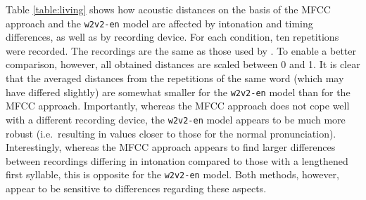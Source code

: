 \documentclass[11pt,a4paper]{article}
\begin{document}
Table \ref{table:living} shows how acoustic distances on the basis of the MFCC approach and the \texttt{w2v2-en} model are affected by intonation and timing differences, as well as by recording device. For each condition, ten repetitions were recorded. The recordings are the same as those used by \citet{acoustic-measure}. To enable a better comparison, however, all obtained distances are scaled between 0 and 1. It is clear that the averaged distances from the repetitions of the same word (which may have differed slightly) are somewhat smaller for the \texttt{w2v2-en} model than for the MFCC approach. Importantly, whereas the MFCC approach does not cope well with a different recording device, the \texttt{w2v2-en} model appears to be much more robust (i.e.~resulting in values closer to those for the normal pronunciation). Interestingly, whereas the MFCC approach appears to find larger differences between recordings differing in intonation compared to those with a lengthened first syllable, this is opposite for the \texttt{w2v2-en} model. Both methods, however, appear to be sensitive to differences regarding these aspects. 
\end{document}
